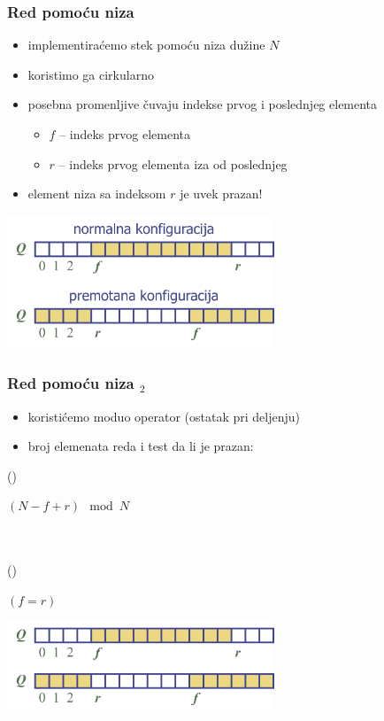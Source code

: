 \documentclass[compress]{beamer}
\begin{document}
\begin{frame}[fragile]
  \frametitle{Red pomoću niza}
  \begin{itemize}
    \item implementiraćemo stek pomoću niza dužine $N$
    \item koristimo ga cirkularno
    \item posebna promenljive čuvaju indekse prvog i poslednjeg elementa
    \begin{itemize}
      \item $f$ -- indeks prvog elementa
      \item $r$ -- indeks prvog elementa iza od poslednjeg
    \end{itemize}
    \item element niza sa indeksom $r$ je uvek prazan!      
  \end{itemize}
  \begin{center}
    \includegraphics[width=8cm]{asp-06-pic01.png}
  \end{center}
\end{frame}

\begin{frame}[fragile]
  \frametitle{Red pomoću niza $_2$}
  \begin{itemize}
    \item koristićemo moduo operator (ostatak pri deljenju)
    \item broj elemenata reda i test da li je prazan:
  \end{itemize}
()
\begin{algorithmic}
\RETURN $(N-f+r) \mod N$
\end{algorithmic}
\\ \ \\
()
\begin{algorithmic}
\RETURN $(f=r)$
\end{algorithmic}
\begin{center}
  \includegraphics[width=8cm]{asp-06-pic02.png}
\end{center}
\end{frame}
\end{document}
